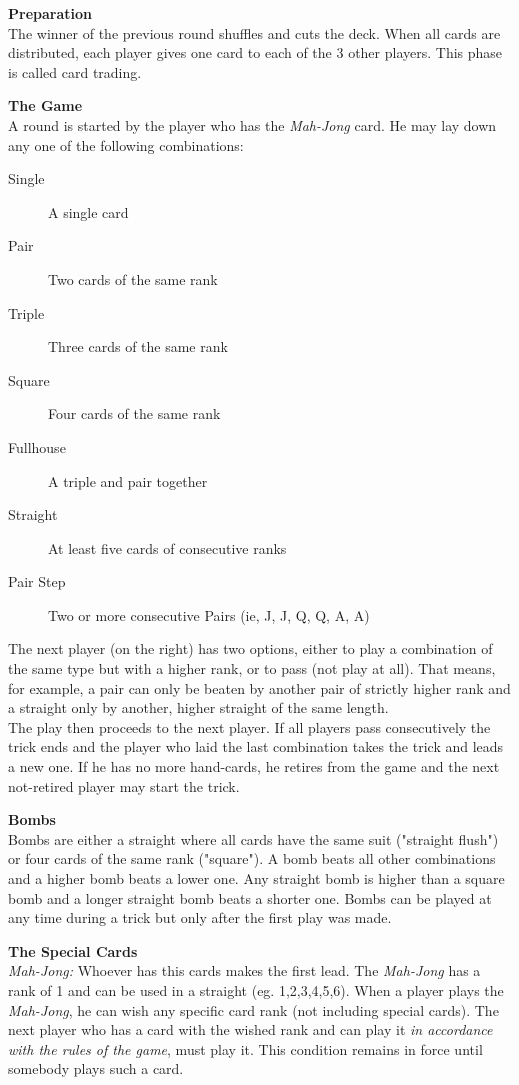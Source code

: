 \noindent\textbf{Preparation}\\
The winner of the previous round shuffles and cuts the deck. When all cards are distributed, each player gives one card to each of the 3 other players. This phase is called card trading.

\noindent\textbf{The Game}\\
A round is started by the player who has the \textit{Mah-Jong} card. He may lay down any one of the following combinations:
\begin{description}
    \item[Single] A single card
    \item[Pair] Two cards of the same rank
    \item[Triple] Three cards of the same rank
    \item[Square] Four cards of the same rank
    \item[Fullhouse] A triple and pair together
    \item[Straight] At least five cards of consecutive ranks
    \item[Pair Step] Two or more consecutive Pairs (ie, J, J, Q, Q, A, A)
\end{description}

The next player (on the right) has two options, either to play a combination of the same type but with a higher rank, or to pass (not play at all). That means, for example, a pair can only be beaten by another pair of strictly higher rank and a straight only by another, higher straight of the same length.\\
The play then proceeds to the next player. If all players pass consecutively the trick ends and the player who laid the last combination takes the trick and leads a new one. If he has no more hand-cards, he retires from the game and the next not-retired player may start the trick.

\textbf{Bombs} \\
Bombs are either a straight where all cards have the same suit ("straight flush") or four cards of the same rank ("square").
A bomb beats all other combinations and a higher bomb beats a lower one. Any straight bomb is higher than a square bomb and a longer straight bomb beats a shorter one.
Bombs can be played at any time during a trick but only after the first play was made.

\textbf{The Special Cards}\\
\textit{Mah-Jong:} Whoever has this cards makes the first lead. The \textit{Mah-Jong} has a rank of 1 and can be used in a straight (eg. 1,2,3,4,5,6).
When a player plays the \textit{Mah-Jong}, he can wish any specific card rank (not including special cards). The next player who has a card with the wished rank and can play it \textit{in accordance with the rules of the game}, must play it. This condition remains in force until somebody plays such a card.

